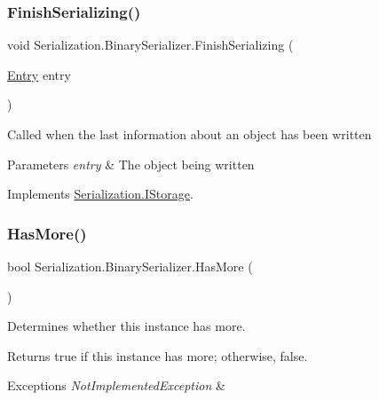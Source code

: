 \subsubsection{\texorpdfstring{Finish\+Serializing()}{FinishSerializing()}}
{\footnotesize\ttfamily void Serialization.\+Binary\+Serializer.\+Finish\+Serializing (\begin{DoxyParamCaption}\item[{\hyperlink{class_serialization_1_1_entry}{Entry}}]{entry }\end{DoxyParamCaption})\hspace{0.3cm}{\ttfamily [inline]}}



Called when the last information about an object has been written 


\begin{DoxyParams}{Parameters}
{\em entry} & The object being written\\
\hline
\end{DoxyParams}


Implements \hyperlink{interface_serialization_1_1_i_storage_a03e6828bebedaa8ec17e5f01a7cbd689}{Serialization.\+I\+Storage}.

\mbox{\label{class_serialization_1_1_binary_serializer_a17489c518844ba789eed665e716db38d}} 
\subsubsection{\texorpdfstring{Has\+More()}{HasMore()}}
{\footnotesize\ttfamily bool Serialization.\+Binary\+Serializer.\+Has\+More (\begin{DoxyParamCaption}{ }\end{DoxyParamCaption})\hspace{0.3cm}{\ttfamily [inline]}}



Determines whether this instance has more. 

\begin{DoxyReturn}{Returns}
{\ttfamily true} if this instance has more; otherwise, {\ttfamily false}.
\end{DoxyReturn}

\begin{DoxyExceptions}{Exceptions}
{\em Not\+Implemented\+Exception} & \\
\hline
\end{DoxyExceptions}


